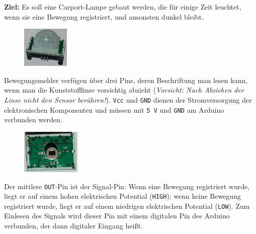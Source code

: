 \begin{ziel}
	\textbf{Ziel:} Es soll eine Carport-Lampe gebaut werden, die für einige Zeit leuchtet, wenn sie eine Bewegung registriert, und ansonsten dunkel bleibt.
\end{ziel}

\begin{figure}
	\centering
	\vspace{-\baselineskip}
	\includegraphics[width=0.2\textwidth]{pics/bewegungsmelder.jpg}
	\label{abb:bewegungsmelder}
	\vspace{-\baselineskip}
\end{figure}
Bewegungsmelder verfügen über drei Pins, deren Beschriftung man lesen kann, wenn man die Kunststofflinse vorsichtig abzieht (\emph{Vorsicht: Nach Abziehen der Linse nicht den Sensor berühren!}). \texttt{Vcc} und \texttt{GND} dienen der Stromversorgung der elektronischen Komponenten und müssen mit \texttt{5\,V} und \texttt{GND} am Arduino verbunden werden. 

\begin{figure}
	\centering
	\vspace{-0.5\baselineskip}
	\includegraphics[width=0.25\textwidth]{pics/bewegungsmelder-ohne-linse.jpg}
	\label{abb:bewegungsmelder-ohne-linse}
	\vspace{-0.5\baselineskip}
\end{figure}
Der mittlere \texttt{OUT}-Pin ist der Signal-Pin: Wenn eine Bewegung registriert wurde, liegt er auf einem hohen elektrischen Potential (\texttt{HIGH}); wenn keine Bewegung registriert wurde, liegt er auf einem niedrigen elektrischen Potential (\texttt{LOW}). Zum Einlesen des Signals wird dieser Pin mit einem digitalen Pin des Arduino verbunden, der dann digitaler Eingang heißt.

